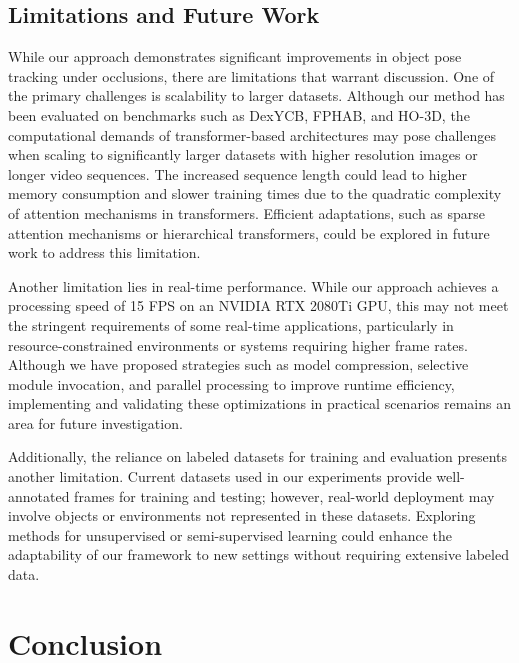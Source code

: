 \subsection{Limitations and Future Work}

While our approach demonstrates significant improvements in object pose tracking under occlusions, there are limitations that warrant discussion. One of the primary challenges is scalability to larger datasets. Although our method has been evaluated on benchmarks such as DexYCB, FPHAB, and HO-3D, the computational demands of transformer-based architectures may pose challenges when scaling to significantly larger datasets with higher resolution images or longer video sequences. The increased sequence length could lead to higher memory consumption and slower training times due to the quadratic complexity of attention mechanisms in transformers. Efficient adaptations, such as sparse attention mechanisms or hierarchical transformers, could be explored in future work to address this limitation.

Another limitation lies in real-time performance. While our approach achieves a processing speed of 15 FPS on an NVIDIA RTX 2080Ti GPU, this may not meet the stringent requirements of some real-time applications, particularly in resource-constrained environments or systems requiring higher frame rates. Although we have proposed strategies such as model compression, selective module invocation, and parallel processing to improve runtime efficiency, implementing and validating these optimizations in practical scenarios remains an area for future investigation.

Additionally, the reliance on labeled datasets for training and evaluation presents another limitation. Current datasets used in our experiments provide well-annotated frames for training and testing; however, real-world deployment may involve objects or environments not represented in these datasets. Exploring methods for unsupervised or semi-supervised learning could enhance the adaptability of our framework to new settings without requiring extensive labeled data.

\section{Conclusion}

